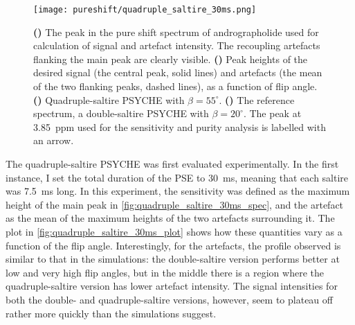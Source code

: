 \begin{figure}[htb]
    \centering
    \texttt{[image: pureshift/quadruple\_saltire\_30ms.png]}%
    {\label{fig:quadruple_saltire_30ms_spec}}%
    {\label{fig:quadruple_saltire_30ms_plot}}%
    {\label{fig:quadruple_saltire_30ms_maybebetter}}%
    {\label{fig:quadruple_saltire_30ms_reference}}%
    \caption[Comparison of 30 ms double saltire and 30 ms quadruple saltire]{
        \textbf{()} The peak in the pure shift spectrum of andrographolide used for calculation of signal and artefact intensity.
        The recoupling artefacts flanking the main peak are clearly visible.
        \textbf{()} Peak heights of the desired signal (the central peak, solid lines) and artefacts (the mean of the two flanking peaks, dashed lines), as a function of flip angle.
        \textbf{()} Quadruple-saltire PSYCHE with $\beta = 55^\circ$.
        \textbf{()} The reference spectrum, a double-saltire PSYCHE with $\beta = 20^\circ$.
        The peak at \qty{3.85}{ppm} used for the sensitivity and purity analysis is labelled with an arrow.
    }
    \label{fig:quadruple_saltire_30ms}
\end{figure}

The quadruple-saltire PSYCHE was first evaluated experimentally.
In the first instance, I set the total duration of the PSE to \qty{30}{\ms}, meaning that each saltire was \qty{7.5}{\ms} long.
In this experiment, the sensitivity was defined as the maximum height of the main peak in \cref{fig:quadruple_saltire_30ms_spec}, and the artefact as the mean of the maximum heights of the two artefacts surrounding it.
The plot in \cref{fig:quadruple_saltire_30ms_plot} shows how these quantities vary as a function of the flip angle.
Interestingly, for the artefacts, the profile observed is similar to that in the simulations: the double-saltire version performs better at low and very high flip angles, but in the middle there is a region where the quadruple-saltire version has lower artefact intensity.
The signal intensities for both the double- and quadruple-saltire versions, however, seem to plateau off rather more quickly than the simulations suggest.


